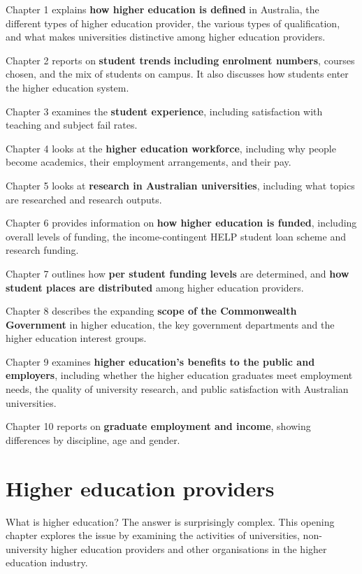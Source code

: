 \documentclass[]{book}
\begin{document}
Chapter 1 explains \textbf{how higher education is defined} in Australia, the different types of higher education provider, the various types of qualification, and what makes universities distinctive among higher education providers.

Chapter 2 reports on \textbf{student trends} \textbf{including enrolment numbers}, courses chosen, and the mix of students on campus. It also discusses how students enter the higher education system.

Chapter 3 examines the \textbf{student experience}, including satisfaction with teaching and subject fail rates.

Chapter 4 looks at the \textbf{higher education workforce}, including why people become academics, their employment arrangements, and their pay.

Chapter 5 looks at \textbf{research in Australian universities}, including what topics are researched and research outputs.

Chapter 6 provides information on \textbf{how higher education is funded}, including overall levels of funding, the income-contingent HELP student loan scheme and research funding.

Chapter 7 outlines how \textbf{per student funding levels} are determined, and \textbf{how student places are distributed} among higher education providers.

Chapter 8 describes the expanding \textbf{scope of the Commonwealth Government} in higher education, the key government departments and the higher education interest groups.

Chapter 9 examines \textbf{higher education's benefits to the public and employers}, including whether the higher education graduates meet employment needs, the quality of university research, and public satisfaction with Australian universities.

Chapter 10 reports on \textbf{graduate employment and income}, showing differences by discipline, age and gender.

\hypertarget{higher-education-providers}{%
\chapter{Higher education providers }\label{higher-education-providers}}

What is higher education? The answer is surprisingly complex. This opening chapter explores the issue by examining the activities of universities, non-university higher education providers and other organisations in the higher education industry.
\end{document}
